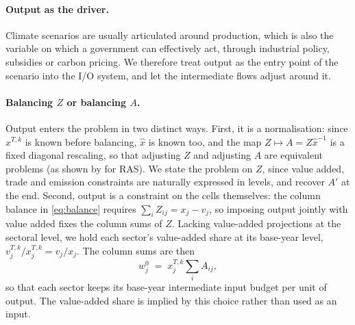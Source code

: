 \documentclass[11pt,a4paper]{article}
\begin{document}
\paragraph{Output as the driver.}
Climate scenarios are usually articulated around production, which is also the variable on which a government can effectively act, through industrial policy, subsidies or carbon pricing. We therefore treat output as the entry point of the scenario into the I/O system, and let the intermediate flows adjust around it.

\paragraph{Balancing $Z$ or balancing $A$.}
Output enters the problem in two distinct ways. First, it is a normalisation: since $x^{T,k}$ is known before balancing, $\hat{x}$ is known too, and the map $Z \mapsto A = Z\hat{x}^{-1}$ is a fixed diagonal rescaling, so that adjusting $Z$ and adjusting $A$ are equivalent problems (as shown by \cite{dietzenbacher2009ras} for RAS). We state the problem on $Z$, since value added,
trade and emission constraints are naturally expressed in levels, and recover $A'$ at the end. Second, output is a constraint on the cells themselves: the column balance in \eqref{eq:balance} requires $\sum_i Z_{ij} = x_j - v_j$, so imposing output jointly with
value added fixes the column sums of $Z$. Lacking value-added projections at the sectoral level, we hold each sector's value-added share at its base-year level, $v^{T,k}_j / x^{T,k}_j = v_j / x_j$. The column sums are then
\begin{equation}\label{eq:colsums}
  w^0_j \;=\; x^{T,k}_j \sum_i A_{ij},
\end{equation}
so that each sector keeps its base-year intermediate input budget per unit of output. The value-added share is implied by this choice rather than used as an input.

\end{document}
